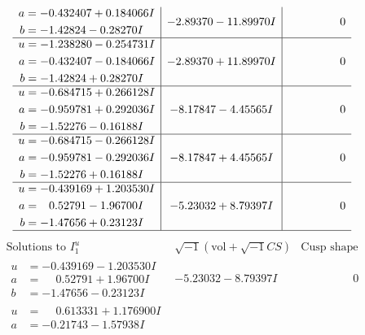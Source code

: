 \documentclass[1p]{elsarticle_modified}
\theoremstyle{definition}
\newcommand{\I}{\sqrt{-1}}
\begin{document}
$$\begin{array}{c|c|c}
\begin{aligned}
a &= -0.432407 + 0.184066 I \\
b &= -1.42824 - 0.28270 I\end{aligned}
 & -2.89370 - 11.89970 I & \phantom{-0.000000 } 0 \\ \hline\begin{aligned}
u &= -1.238280 - 0.254731 I \\
a &= -0.432407 - 0.184066 I \\
b &= -1.42824 + 0.28270 I\end{aligned}
 & -2.89370 + 11.89970 I & \phantom{-0.000000 } 0 \\ \hline\begin{aligned}
u &= -0.684715 + 0.266128 I \\
a &= -0.959781 + 0.292036 I \\
b &= -1.52276 - 0.16188 I\end{aligned}
 & -8.17847 - 4.45565 I & \phantom{-0.000000 } 0 \\ \hline\begin{aligned}
u &= -0.684715 - 0.266128 I \\
a &= -0.959781 - 0.292036 I \\
b &= -1.52276 + 0.16188 I\end{aligned}
 & -8.17847 + 4.45565 I & \phantom{-0.000000 } 0 \\ \hline\begin{aligned}
u &= -0.439169 + 1.203530 I \\
a &= \phantom{-}0.52791 - 1.96700 I \\
b &= -1.47656 + 0.23123 I\end{aligned}
 & -5.23032 + 8.79397 I & \phantom{-0.000000 } 0\\
 \hline 
 \end{array}$$\newpage$$\begin{array}{c|c|c}  
\text{Solutions to }I^u_{1}& \I (\text{vol} + \sqrt{-1}CS) & \text{Cusp shape}\\
 \hline 
\begin{aligned}
u &= -0.439169 - 1.203530 I \\
a &= \phantom{-}0.52791 + 1.96700 I \\
b &= -1.47656 - 0.23123 I\end{aligned}
 & -5.23032 - 8.79397 I & \phantom{-0.000000 } 0 \\ \hline\begin{aligned}
u &= \phantom{-}0.613331 + 1.176900 I \\
a &= -0.21743 - 1.57938 I \\

\end{aligned}
\end{array}$$
\end{document}
